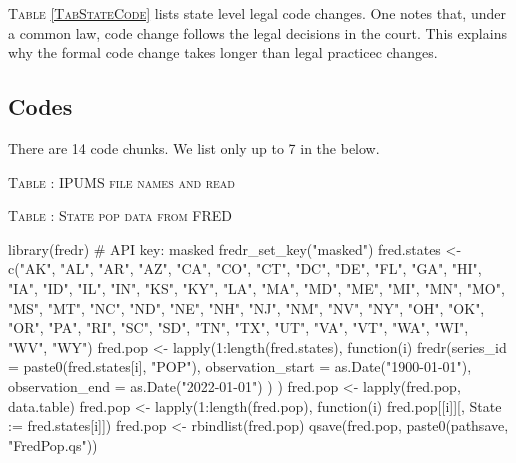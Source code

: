 \textsc{Table \ref{TabStateCode}} lists state level legal code changes. One notes that, under a common law, code change follows the legal decisions in the court. This explains why the formal code change takes longer than legal practicec changes. 

{\footnotesize
\setlength{\baselineskip}{8pt}

}

\clearpage
\begin{appendix}
\section{Codes}
\renewcommand{\thetable}{\Alph{section}\arabic{table}}
There are 14 code chunks. We list only up to 7 in the below.


\setcounter{table}{0}
\textsc{Table \thetable: IPUMS file names and read}
\begin{Schunk}
\end{Schunk}

\clearpage
\textsc{Table \thetable: State pop data from FRED}
\begin{Schunk}
\begin{Sinput}
library(fredr)
# API key: masked
fredr_set_key("masked")
fred.states <- c("AK", "AL", "AR", "AZ", "CA", "CO", "CT", "DC", "DE", 
  "FL", "GA", "HI", "IA", "ID", "IL", "IN", "KS", "KY", "LA", "MA", "MD", 
  "ME", "MI", "MN", "MO", "MS", "MT", "NC", "ND", "NE", "NH", "NJ", 
  "NM", "NV", "NY", "OH", "OK", "OR", "PA", "RI", "SC", "SD", "TN", 
  "TX", "UT", "VA", "VT", "WA", "WI", "WV", "WY")
fred.pop <- lapply(1:length(fred.states), function(i)
    fredr(series_id = paste0(fred.states[i], "POP"),
      observation_start = as.Date("1900-01-01"),
      observation_end = as.Date("2022-01-01")
    )
  )
fred.pop <- lapply(fred.pop, data.table)
fred.pop <- lapply(1:length(fred.pop), function(i) fred.pop[[i]][, 
  State := fred.states[i]])
fred.pop <- rbindlist(fred.pop)
qsave(fred.pop, paste0(pathsave, "FredPop.qs"))
\end{Sinput}
\end{Schunk}


\end{appendix}
